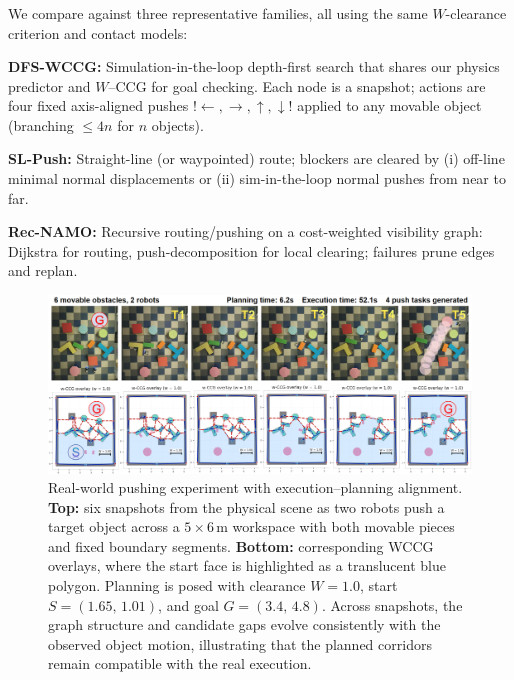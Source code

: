 \subsubsection{}
\label{subsec:baselines}
We compare against three representative families, all using the same
$W$-clearance criterion and contact models:

\textbf{DFS-WCCG:} Simulation-in-the-loop depth-first search 
that shares our physics predictor and $W$–CCG for goal checking.
Each node is a snapshot; actions are four fixed axis-aligned pushes 
${!\leftarrow,\rightarrow,\uparrow,\downarrow!}$ 
applied to any movable object (branching $\le 4n$ for $n$ objects).

\textbf{SL-Push:} Straight-line (or waypointed) route; blockers are
cleared by (i) off-line minimal normal displacements or
(ii) sim-in-the-loop normal pushes from near to far.

\textbf{Rec-NAMO:} Recursive routing/pushing on a cost-weighted
  visibility graph: Dijkstra for routing, push-decomposition for local
  clearing; failures prune edges and replan.

\begin{figure}
  \centering
  \includegraphics[width=1\linewidth]{figures/hardware_wccg.png}
  \vspace{-2mm}
\caption{Real-world pushing experiment with execution--planning alignment. 
\textbf{Top:} six snapshots from the physical scene as two robots push a target object across a \(5\times 6\,\mathrm{m}\) workspace with both movable pieces and fixed boundary segments. \textbf{Bottom:} corresponding WCCG overlays, where the start face is highlighted as a translucent blue polygon. Planning is posed with clearance \(W=1.0\), start \(S=(1.65,\,1.01)\), and goal \(G=(3.4,\,4.8)\). Across snapshots, the graph structure and candidate gaps evolve consistently with the observed object motion, illustrating that the planned corridors remain compatible with the real execution.}
\end{figure}

